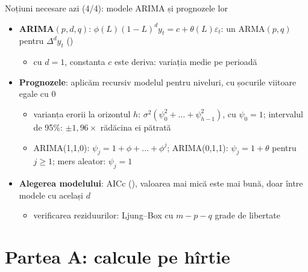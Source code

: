 \begin{frame}{Noțiuni necesare azi (4/4): modele ARIMA și prognozele lor}
\itemsize{\small}
\begin{itemize}
    \item \textbf{ARIMA$(p,d,q)$}: $\phi(L)(1 - L)^d y_t = c + \theta(L)\varepsilon_t$: un ARMA$(p,q)$ pentru $\Delta^d y_t$ ()
    \begin{itemize}
        \item cu $d = 1$, constanta $c$ este deriva: variația medie pe perioadă
    \end{itemize}
    \item \textbf{Prognozele}: aplicăm recursiv modelul pentru niveluri, cu șocurile viitoare egale cu 0
    \begin{itemize}
        \item varianța erorii la orizontul $h$: $\sigma^2(\psi_0^2 + \dots + \psi_{h-1}^2)$, cu $\psi_0 = 1$; intervalul de 95\%: $\pm 1{,}96\times$ rădăcina ei pătrată
        \item ARIMA(1,1,0): $\psi_j = 1 + \phi + \dots + \phi^j$; ARIMA(0,1,1): $\psi_j = 1 + \theta$ pentru $j \ge 1$; mers aleator: $\psi_j = 1$
    \end{itemize}
    \item \textbf{Alegerea modelului}: AICc (), valoarea mai mică este mai bună, doar între modele cu același $d$
    \begin{itemize}
        \item verificarea reziduurilor: Ljung--Box cu $m - p - q$ grade de libertate
    \end{itemize}
\end{itemize}
\end{frame}


\section{Partea A: calcule pe hîrtie}

